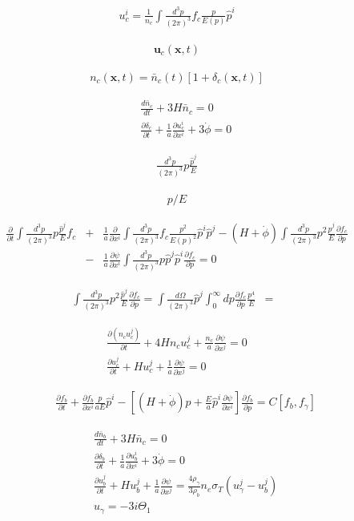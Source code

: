 \documentclass[a4paper, 11pt]{article}
\def\ba{\begin{eqnarray}}
\def\ea{\end{eqnarray}}
\begin{document}
\ba
u^{i}_{c} = \frac{1}{n_{c}} \int \frac{d^{3}p}{(2\pi)^{3}} f_{c} \frac{p}{E(p)}\hat{p}^{i}
\ea

\ba
{\bm u}_{c}(\bm{x},t)
\ea

\ba
n_{c}(\bm{x},t) = \bar{n}_{c}(t)[1+\delta_{c} (\bm{x},t)]
\ea


\ba
&&  \frac{d \bar{n}_{c}}{ d t} + 3 H \bar{n}_{c} = 0 \\
&&\frac{\partial \delta_{c}}{\partial t} + \frac{1}{a}  \frac{\partial u^{i}_{c}}{ \partial x^{i}}  + 3  \dot{\phi} = 0
\ea

\ba
\frac{d^{3}p}{(2\pi)^{3}} p \frac{\hat{p}^{j}}{E}
\ea

\ba
p/E 
\ea

\ba
\frac{\partial }{ \partial t} \int \frac{d^{3}p}{(2\pi)^{3}} p \frac{\hat{p}^{j}}{E} f_{c}  &+& \frac{1}{a}  \frac{\partial}{ \partial x^{i}} \int \frac{d^{3}p}{(2\pi)^{3}} f_{c} \frac{p^{2}}{E(p)^{2}}\hat{p}^{i}\hat{p}^{j}   
- (H + \dot{\phi})  \int \frac{d^{3}p}{(2\pi)^{3}} p^{2} \frac{\hat{p}^{j}}{E} \frac{\partial f_{c}}{ \partial p} \nonumber \\
&-& \frac{1}{a} \frac{\partial \psi}{\partial x^{i}} \int \frac{d^{3}p}{(2\pi)^{3}} p \hat{p}^{j}  \hat{p}^{i}   \frac{\partial f_{c}}{ \partial p}  = 0
\ea

\ba
\int \frac{d^{3}p}{(2\pi)^{3}} p^{2} \frac{\hat{p}^{j}}{E} \frac{\partial f_{c}}{ \partial p} =  \int  \frac{d\Omega}{(2\pi)^{3}}\hat{p}^{j} \int^{\infty}_{0} dp  \frac{\partial f_{c}}{ \partial p} \frac{p^{4}}{E}
&=& 
\ea

\ba
\frac{\partial (n_{c} u^{j}_{c})}{\partial t} + 4Hn_{c}u^{j}_{c} + \frac{n_{c}}{a} \frac{\partial \psi}{\partial x^{j}}= 0 \\
\frac{\partial u^{j}_{c}}{\partial t} + Hu^{j}_{c} + \frac{1}{a} \frac{\partial \psi}{\partial x^{j}}= 0
\ea

\ba
&&\frac{\partial f_{b}}{ \partial t} + \frac{\partial f_{b}}{ \partial x^{i}} \frac{p}{aE}\hat{p}^{i}  - \left[  (H + \dot{\phi})p + \frac{E}{a} \hat{p}^{i} \frac{\partial \psi}{\partial x^{i}}  \right]\frac{\partial f_{b}}{ \partial p}  = C[f_{b}, f_{\gamma}]
\ea

\ba
&&  \frac{d \bar{n}_{b}}{ d t} + 3 H \bar{n}_{c} = 0 \\
&&\frac{\partial \delta_{b}}{\partial t} + \frac{1}{a}  \frac{\partial u^{i}_{b}}{ \partial x^{i}}  + 3  \dot{\phi} = 0 \\
&&\frac{\partial u^{j}_{b}}{\partial t} + Hu^{j}_{b} + \frac{1}{a} \frac{\partial \psi}{\partial x^{j}}=  \frac{4\rho_{\gamma}}{3\rho_{b}}n_{e}\sigma_{T}( u^{j}_{\gamma} -  u^{j}_{b}) \\
&& u_{\gamma} = -3i\Theta_{1}
\ea
\end{document}
